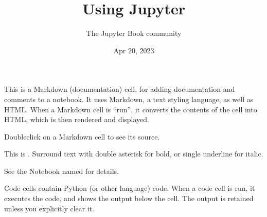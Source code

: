 \documentclass[letterpaper,10pt,english]{jupyterBook}
\title{Using Jupyter}
\date{Apr 20, 2023}
\author{The Jupyter Book community}
\begin{document}
\pagestyle{empty}
\sphinxmaketitle
\pagestyle{plain}
\sphinxtableofcontents
\pagestyle{normal}
\label{\detokenize{JupyterDemo::doc}}




\begin{DUlineblock}{0em}
\item[] 
\end{DUlineblock}

\sphinxAtStartPar
This is a Markdown (documentation) cell, for adding documentation and comments to a notebook. It uses Markdown, a text styling language, as well as HTML. When a Markdown cell is “run”, it converts the contents of the cell into HTML, which is then rendered and displayed.

\sphinxAtStartPar
Double\sphinxhyphen{}click on a Markdown cell to see its source.

\sphinxAtStartPar
This is  . Surround text with double asterisk for bold, or single underline for italic.

\sphinxAtStartPar
See the Notebook named  for details.

\begin{DUlineblock}{0em}
\item[] 
\end{DUlineblock}

\sphinxAtStartPar
Code cells contain Python (or other language) code. When a code cell is run, it executes the code, and shows the output below the cell. The output is retained unless you explicitly clear it.
\end{document}
